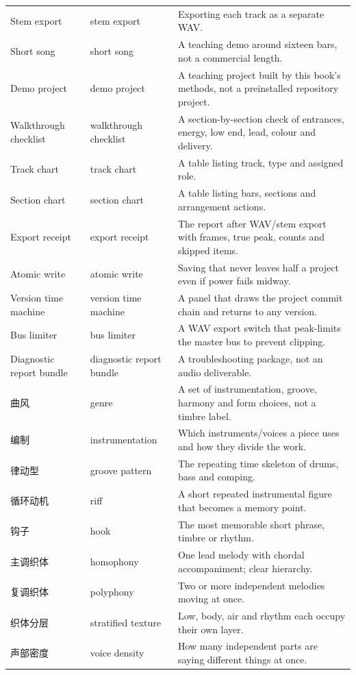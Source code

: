 \begin{longtable}{p{}p{}p{}}
Stem export & stem export & Exporting each track as a separate WAV. \\
Short song & short song & A teaching demo around sixteen bars, not a commercial length. \\
Demo project & demo project & A teaching project built by this book's methods, not a preinstalled repository project. \\
Walkthrough checklist & walkthrough checklist & A section-by-section check of entrances, energy, low end, lead, colour and delivery. \\
Track chart & track chart & A table listing track, type and assigned role. \\
Section chart & section chart & A table listing bars, sections and arrangement actions. \\
Export receipt & export receipt & The report after WAV/stem export with frames, true peak, counts and skipped items. \\
Atomic write & atomic write & Saving that never leaves half a project even if power fails midway. \\
Version time machine & version time machine & A panel that draws the project commit chain and returns to any version. \\
Bus limiter & bus limiter & A WAV export switch that peak-limits the master bus to prevent clipping. \\
Diagnostic report bundle & diagnostic report bundle & A troubleshooting package, not an audio deliverable. \\
曲风 & genre & A set of instrumentation, groove, harmony and form choices, not a timbre label. \\
编制 & instrumentation & Which instruments/voices a piece uses and how they divide the work. \\
律动型 & groove pattern & The repeating time skeleton of drums, bass and comping. \\
循环动机 & riff & A short repeated instrumental figure that becomes a memory point. \\
钩子 & hook & The most memorable short phrase, timbre or rhythm. \\
主调织体 & homophony & One lead melody with chordal accompaniment; clear hierarchy. \\
复调织体 & polyphony & Two or more independent melodies moving at once. \\
织体分层 & stratified texture & Low, body, air and rhythm each occupy their own layer. \\
声部密度 & voice density & How many independent parts are saying different things at once. \\

\end{longtable}
